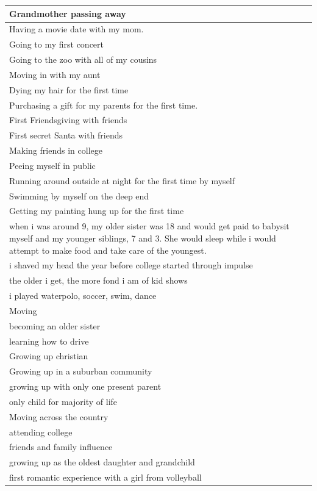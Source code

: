 \documentclass[
  .7em,
  letterpaper,
  DIV=11,
  numbers=noendperiod]{scrartcl}
\begin{document}
\begin{table}
\begin{tabular}{l}
\hline
Grandmother passing away\\
\hline
Having a movie date with my mom.\\
\hline
Going to my first concert\\
\hline
Going to the zoo with all of my cousins\\
\hline
Moving in with my aunt\\
\hline
Dying my hair for the first time\\
\hline
Purchasing a gift for my parents for the first time.\\
\hline
First Friendsgiving with friends\\
\hline
First secret Santa with friends\\
\hline
Making friends in college\\
\hline
Peeing myself in public\\
\hline
Running around outside at night for the first time by myself\\
\hline
Swimming by myself on the deep end\\
\hline
Getting my painting hung up for the first time\\
\hline
when i was around 9, my older sister was 18 and would get paid to babysit myself and my younger siblings, 7 and 3. She would sleep while i would attempt to make food and take care of the youngest.\\
\hline
i shaved my head the year before college started through impulse\\
\hline
the older i get, the more fond i am of kid shows\\
\hline
i played waterpolo, soccer, swim, dance\\
\hline
Moving\\
\hline
becoming an older sister\\
\hline
learning how to drive\\
\hline
Growing up christian\\
\hline
Growing up in a suburban community\\
\hline
growing up with only one present parent\\
\hline
only child for majority of life\\
\hline
Moving across the country\\
\hline
attending college\\
\hline
friends and family influence\\
\hline
growing up as the oldest daughter and grandchild\\
\hline
first romantic experience with a girl from volleyball\\

\end{tabular}
\end{table}
\end{document}
